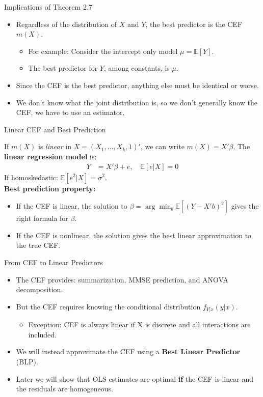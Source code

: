 \documentclass[aspectratio=169]{beamer}
\numberwithin{equation}{section}
\begin{document}
\begin{frame}{Implications of Theorem 2.7}
\begin{itemize}
\item Regardless of the distribution of $X$ and $Y$, the best predictor is the CEF $m(X)$.
\begin{itemize}
\item For example: Consider the intercept only model $\mu=\mathbb{E}[Y]$.
\item The best predictor for $Y$, among constants, is $\mu$.
\end{itemize}
\item Since the CEF is the best predictor, anything else must be identical or worse.
\item We don't know what the joint distribution is, so we don't generally know the CEF, we have to use an estimator.
\end{itemize}
\end{frame}

\begin{frame}{Linear CEF and Best Prediction}

If $m(X)$ is \emph{linear} in $X=(X_1,\ldots,X_k,1)'$, we can write $m(X)=X'\beta$.  The \textbf{linear regression model} is:
\begin{align*}
Y&=X'\beta+e, \quad \mathbb{E}[e|X]=0
\end{align*}
If homoskedastic: $\mathbb{E}[e^2|X]=\sigma^2$.\\
\bigskip\pause
\textbf{Best prediction property:}
\begin{itemize}
\item If the CEF is linear, the solution to $\beta=\arg \min_b \mathbb{E}[(Y-X'b)^2]$ gives the right formula for $\beta$.
\item If the CEF is nonlinear, the solution gives the best linear approximation to the true CEF.
\end{itemize}
\end{frame}

\begin{frame}{From CEF to Linear Predictors}
\begin{itemize}
\item The CEF provides: summarization, MMSE prediction, and ANOVA decomposition.\pause
\item But the CEF requires knowing the conditional distribution $f_{Y|x}(y|x)$.
\begin{itemize}
\item Exception: CEF is always linear if X is discrete and all interactions are included.
\end{itemize}\pause
\item We will instead approximate the CEF using a \textbf{Best Linear Predictor} (BLP).
\item Later we will show that OLS estimates are optimal \textbf{if} the CEF is linear and the residuals are homogeneous.
\end{itemize}
\end{frame}
\end{document}
